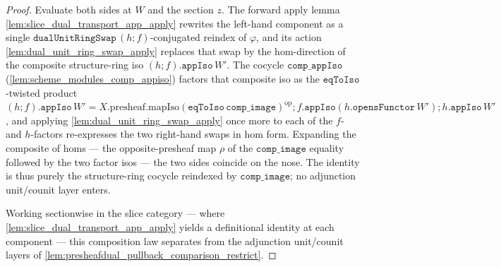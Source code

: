 \begin{proof}
  \leanok
  Evaluate both sides at \(W\) and the section \(z\). The forward apply lemma
  \cref{lem:slice_dual_transport_app_apply} rewrites the left-hand component as a single
  \(\mathtt{dualUnitRingSwap}\,(h\mathbin{;}f)\)-conjugated reindex of \(\varphi\), and its action
  \cref{lem:dual_unit_ring_swap_apply} replaces that swap by the \(\mathrm{hom}\)-direction of the
  composite structure-ring iso \((h\mathbin{;}f).\mathtt{appIso}\,W'\). The cocycle \(\mathtt{comp\_appIso}\)
  (\cref{lem:scheme_modules_comp_appiso}) factors that composite iso as the \(\mathtt{eqToIso}\)-twisted
  product
  \((h\mathbin{;}f).\mathtt{appIso}\,W' = X.\mathrm{presheaf}.\mathrm{mapIso}(\mathtt{eqToIso}\,
  \mathtt{comp\_image})^{\mathrm{op}} \mathbin{;} f.\mathtt{appIso}(h.\mathtt{opensFunctor}\,W')
  \mathbin{;} h.\mathtt{appIso}\,W'\), and applying \cref{lem:dual_unit_ring_swap_apply} once more to each
  of the \(f\)- and \(h\)-factors re-expresses the two right-hand swaps in \(\mathrm{hom}\) form. Expanding
  the composite of homs --- the opposite-presheaf map \(\rho\) of the \(\mathtt{comp\_image}\) equality
  followed by the two factor isos --- the two sides coincide on the nose. The identity is thus purely the
  structure-ring cocycle reindexed by \(\mathtt{comp\_image}\); no adjunction unit/counit layer enters.

  Working sectionwise in the slice category --- where \cref{lem:slice_dual_transport_app_apply} yields a
  definitional identity at each component --- this composition law separates from the adjunction
  unit/counit layers of \cref{lem:presheafdual_pullback_comparison_restrict}.
\end{proof}

